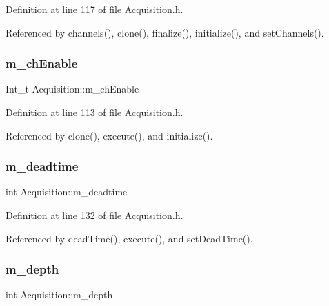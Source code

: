 Definition at line 117 of file Acquisition.\+h.



Referenced by channels(), clone(), finalize(), initialize(), and set\+Channels().

\mbox{\label{classAcquisition_a217269bc403d9fd271a1701c98afb30e}} 
\subsubsection{\texorpdfstring{m\+\_\+ch\+Enable}{m\_chEnable}}
{\footnotesize\ttfamily Int\+\_\+t Acquisition\+::m\+\_\+ch\+Enable\hspace{0.3cm}{\ttfamily [private]}}



Definition at line 113 of file Acquisition.\+h.



Referenced by clone(), execute(), and initialize().

\mbox{\label{classAcquisition_a5f7fe20506e7d860ed61935255adfe17}} 
\subsubsection{\texorpdfstring{m\+\_\+deadtime}{m\_deadtime}}
{\footnotesize\ttfamily int Acquisition\+::m\+\_\+deadtime\hspace{0.3cm}{\ttfamily [private]}}



Definition at line 132 of file Acquisition.\+h.



Referenced by dead\+Time(), execute(), and set\+Dead\+Time().

\mbox{\label{classAcquisition_a26628424533a2dd74d24712a14637a72}} 
\subsubsection{\texorpdfstring{m\+\_\+depth}{m\_depth}}
{\footnotesize\ttfamily int Acquisition\+::m\+\_\+depth\hspace{0.3cm}{\ttfamily [private]}}



